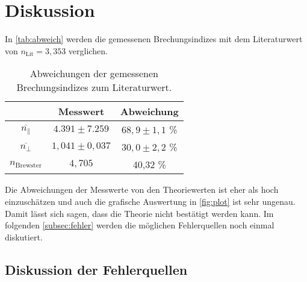 \section{Diskussion}
\label{sec:Diskussion}

In \autoref{tab:abweich} werden die gemessenen Brechungsindizes mit dem Literaturwert von $n_{\text{Lit}}=3,353$ verglichen.
\begin{table}[H]
    \centering
    \caption{Abweichungen der gemessenen Brechungsindizes zum Literaturwert.}
    \label{tab:abweich}
    \begin{tabular}{c c c}
        \toprule
         & Messwert & Abweichung \\
        \midrule
        $\overline{n_\parallel}$ & $4.391 \pm 7.259$ & $68,9 \pm 1,1$ \% \\
        $\overline{n_\perp}$ & $1,041 \pm 0,037$ & $30,0 \pm 2,2$ \% \\
        $n_{\text{Brewster}}$ & $4,705$ & 40,32 \% \\
        \bottomrule
    \end{tabular}
\end{table}


\noindent
Die Abweichungen der Messwerte von den Theoriewerten ist eher als hoch einzuschätzen und auch die grafische Auswertung in \autoref{fig:plot} ist sehr
ungenau. Damit lässt sich sagen, dass die Theorie nicht bestätigt werden kann. Im folgenden \autoref{subsec:fehler} werden die möglichen Fehlerquellen noch einmal diskutiert.

\subsection{Diskussion der Fehlerquellen}
\label{subsec:fehler}


